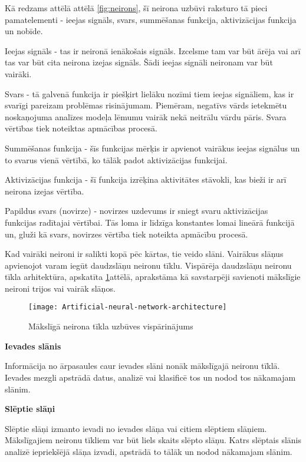 Kā redzams attēlā attēlā \ref{fig:neirons}, šī neirona uzbūvi raksturo tā pieci pamatelementi - ieejas signāls, svars, summēšanas funkcija, aktivizācijas funkcija un nobīde.

Ieejas signāls - tas ir neironā ienākošais signāls. Izcelsme tam var būt ārēja vai arī tas var būt cita neirona izejas signāls. Šādi ieejas signāli neironam var būt vairāki.

Svars - tā galvenā funkcija ir piešķirt lielāku nozīmi tiem ieejas signāliem, kas ir svarīgi pareizam problēmas risinājumam. Piemēram, negatīvs vārds ietekmētu noskaņojuma analīzes modeļa lēmumu vairāk nekā neitrālu vārdu pāris. Svara vērtības tiek noteiktas apmācības procesā.

Summēšanas funkcija - šīs funkcijas mērķis ir apvienot vairākus ieejas signālus un to svarus vienā vērtībā, ko tālāk padot aktivizācijas funkcijai.

Aktivizācijas funkcija - šī funkcija izrēķina aktivitātes stāvokli, kas bieži ir arī neirona izejas vērtība.	

Papildus svars (novirze) -  novirzes uzdevums ir sniegt svaru aktivizācijas funkcijas radītajai vērtībai. Tās loma ir līdzīga konstantes lomai lineārā funkcijā un, gluži kā svars, novirzes vērtība tiek noteikta apmācību procesā.

Kad vairāki neironi ir salikti kopā pēc kārtas, tie veido slāni. Vairākus slāņus apvienojot varam iegūt daudzslāņu neironu tīklu. Vispārēja daudzslāņu neironu tīkla arhitektūra, apskatīta \ref{fig:Artificial-neural-network-architecture}attēlā, aprakstāma kā savstarpēji savienoti mākslīgie neironi trijos vai vairāk slāņos.

\begin{figure}[H]
	\texttt{[image: Artificial-neural-network-architecture]}
	\caption{Mākslīgā neirona tīkla uzbūves vispārinājums \cite{artificialNeuralNetBre} }
	\label{fig:Artificial-neural-network-architecture}
\end{figure}

\textbf{Ievades slānis}

Informācija no ārpasaules caur ievades slāni nonāk mākslīgajā neironu tīklā. Ievades mezgli apstrādā datus, analizē vai klasificē tos un nodod tos nākamajam slānim.

\textbf{Slēptie slāņi}

Slēptie slāņi izmanto ievadi no ievades slāņa vai citiem slēptiem slāņiem. Mākslīgajiem neironu tīkliem var būt liels skaits slēpto slāņu. Katrs slēptais slānis analizē iepriekšējā slāņa izvadi, apstrādā to tālāk un nodod nākamajam slānim.

